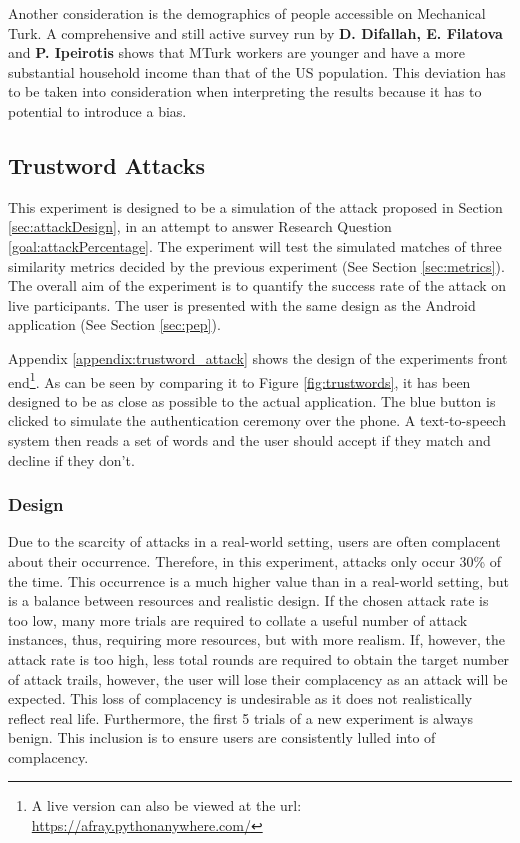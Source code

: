 Another consideration is the demographics of people accessible on Mechanical Turk. A comprehensive and still active survey run by \textbf{D. Difallah, E. Filatova} and \textbf{P. Ipeirotis}\cite{difallah2018demographics} shows that MTurk workers are younger and have a more substantial household income than that of the US population. This deviation has to be taken into consideration when interpreting the results because it has to potential to introduce a bias.

\newpage

\subsection{Trustword Attacks}
\label{sec:exp2_design}

This experiment is designed to be a simulation of the attack proposed in Section \ref{sec:attackDesign}, in an attempt to answer Research Question \ref{goal:attackPercentage}. The experiment will test the simulated matches of three similarity metrics decided by the previous experiment (See Section \ref{sec:metrics}). The overall aim of the experiment is to quantify the success rate of the attack on live participants. The user is presented with the same design as the \pep Android application (See Section \ref{sec:pep}).

Appendix \ref{appendix:trustword_attack} shows the design of the experiments front end\footnote{A live version can also be viewed at the url: \url{https://afray.pythonanywhere.com/}}. As can be seen by comparing it to Figure \ref{fig:trustwords}, it has been designed to be as close as possible to the actual application. The blue button is clicked to simulate the authentication ceremony over the phone. A text-to-speech system then reads a set of words and the user should accept if they match and decline if they don't.

\subsubsection{Design}

Due to the scarcity of attacks in a real-world setting, users are often complacent about their occurrence. Therefore, in this experiment, attacks only occur 30\% of the time. This occurrence is a much higher value than in a real-world setting, but is a balance between resources and realistic design. If the chosen attack rate is too low, many more trials are required to collate a useful number of attack instances, thus, requiring more resources, but with more realism. If, however, the attack rate is too high, less total rounds are required to obtain the target number of attack trails, however, the user will lose their complacency as an attack will be expected. This loss of complacency is undesirable as it does not realistically reflect real life. Furthermore, the first 5 trials of a new experiment is always benign. This inclusion is to ensure users are consistently lulled into of complacency.

